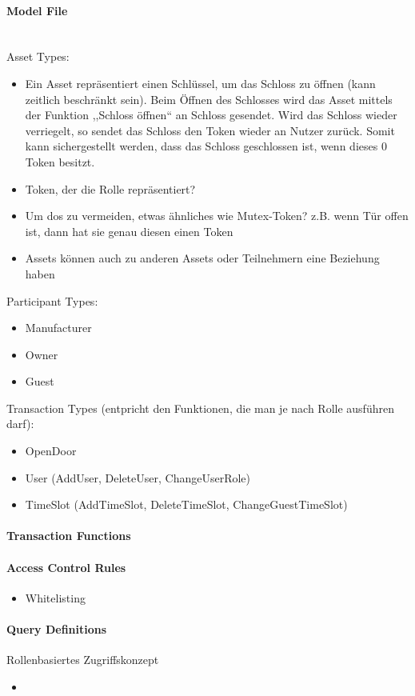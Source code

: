         \paragraph{\textrm{Model File}}\hspace{0cm}\smallskip\\
            Asset Types:
            \begin{itemize}[noitemsep]
                \item Ein Asset repräsentiert einen Schlüssel, um das Schloss zu öffnen (kann zeitlich beschränkt sein). 
                    Beim Öffnen des Schlosses wird das Asset mittels der Funktion ,,Schloss öffnen`` an Schloss gesendet.
                    Wird das Schloss wieder verriegelt, so sendet das Schloss den Token wieder an Nutzer zurück.
                    Somit kann sichergestellt werden, dass das Schloss geschlossen ist, wenn dieses 0 Token besitzt.
                \item Token, der die Rolle repräsentiert?
                \item Um \gls{dos} zu vermeiden, etwas ähnliches wie Mutex-Token? z.B. wenn Tür offen ist, dann hat sie genau diesen einen Token
                \item Assets können auch zu anderen Assets oder Teilnehmern eine Beziehung haben\cite{ComposerDocs}
            \end{itemize}
            
            Participant Types:
            \begin{itemize}[noitemsep]
                \item Manufacturer
                \item Owner
                \item Guest
            \end{itemize}
        
            Transaction Types (entpricht den Funktionen, die man je nach Rolle ausführen darf):
            \begin{itemize}[noitemsep]
                \item OpenDoor
                \item User (AddUser, DeleteUser, ChangeUserRole)
                \item TimeSlot (AddTimeSlot, DeleteTimeSlot, ChangeGuestTimeSlot)
            \end{itemize}
    
    \paragraph{Transaction Functions}
    
    \paragraph{Access Control Rules}
        \begin{itemize}
            \item Whitelisting
        \end{itemize}
    
    \paragraph{Query Definitions}
    
    Rollenbasiertes Zugriffskonzept
    \begin{itemize}[noitemsep]
        \item 
    \end{itemize}